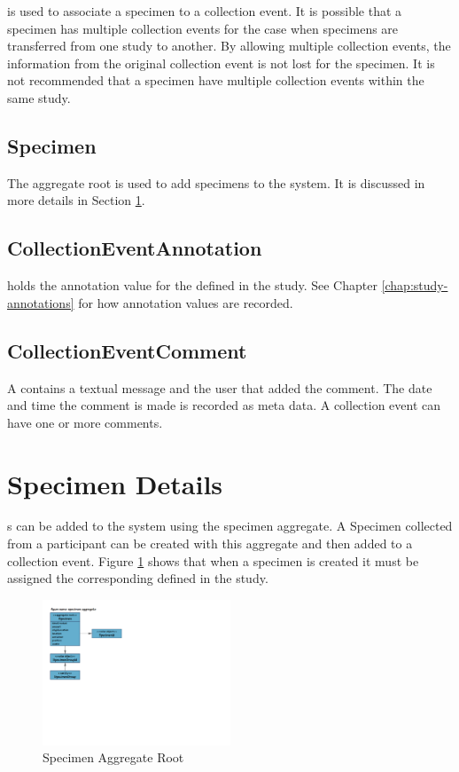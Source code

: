  is used to associate a specimen to a
collection event. It is possible that a specimen has multiple collection events
for the case when specimens are transferred from one study to another. By
allowing multiple collection events, the information from the original
collection event is not lost for the specimen. It is not recommended that a
specimen have multiple collection events within the same study.

\subsection*{Specimen}
The  aggregate root is used to add specimens to the
system. It is discussed in more details in Section
\ref{sec:specimen-aggregate}.

\subsection*{CollectionEventAnnotation}
 holds the annotation value for the
 defined in the study. See
Chapter \ref{chap:study-annotations} for how annotation values are recorded.

\subsection*{CollectionEventComment}
A  contains a textual message and the user
that added the comment. The date and time the comment is made is recorded as
meta data. A collection event can have one or more comments.

\section{Specimen Details}
\label{sec:specimen-aggregate}
s can be added to the system using the specimen
aggregate. A Specimen collected from a participant can be created with this
aggregate and then added to a collection event. Figure
\ref{fig:specimen-aggregate} shows that when a specimen is created it must be
assigned the corresponding  defined in the study.

\begin{figure}[H]
  \centering
  \includegraphics[trim={10mm 96mm 158mm 18mm}, clip,
    width=0.5\textwidth]{images/specimen-aggregate}
  \caption{Specimen Aggregate Root}
  \label{fig:specimen-aggregate}
\end{figure}

